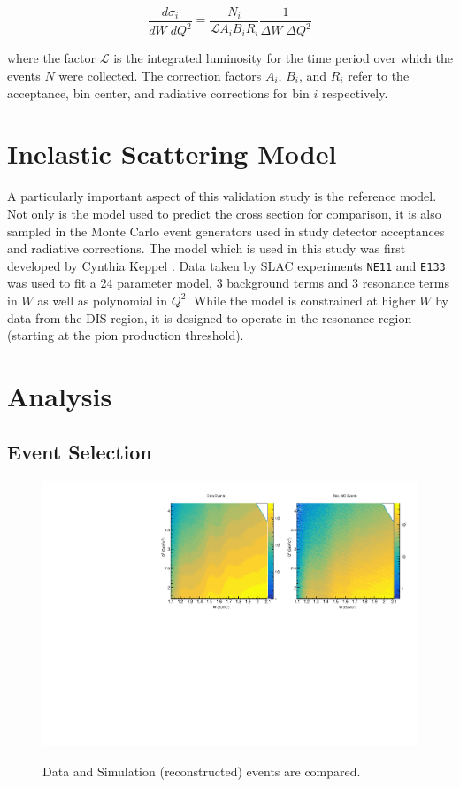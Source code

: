\begin{equation}
	\frac{d\sigma_i}{dW \; dQ^2} = \frac{N_i}{\mathcal{L} A_i B_i R_i} \frac{1}{\Delta W \; \Delta Q^2}
\end{equation}

where the factor $\mathcal{L}$ is the integrated luminosity for the time period over which the events $N$ were collected.  The correction factors $A_i$, $B_i$, and $R_i$ refer to the acceptance, bin center, and radiative corrections for bin $i$ respectively.  

\section{Inelastic Scattering Model}
A particularly important aspect of this validation study is the reference model.  Not only is the model used to predict the cross section for comparison, it is also sampled in the Monte Carlo event generators used in study detector acceptances and radiative corrections.  The model which is used in this study was first developed by Cynthia Keppel \cite{theses-keppel:1994}.  Data taken by SLAC experiments \texttt{NE11} and \texttt{E133} was used to fit a 24 parameter model, 3 background terms and 3 resonance terms in $W$ as well as polynomial in $Q^2$.  While the model is constrained at higher $W$ by data from the DIS region, it is designed to operate in the resonance region (starting at the pion production threshold).

\section{Analysis}
\subsection{Event Selection}

\begin{figure}
	\centering
	\includegraphics[width=\textwidth]{image/plots/inclusive/w_qq.pdf}
	\label{fig:wqq-data-sim}
	\caption[Inclusive data and simulation comparison.]{Data and Simulation (reconstructed) events are compared.}
\end{figure}

